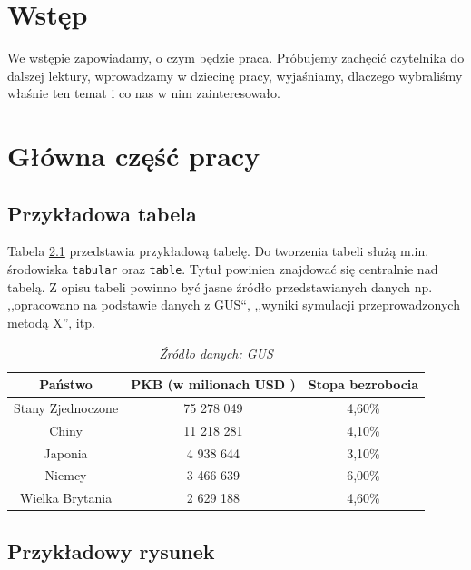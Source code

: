 \documentclass[]{pwr_wmat_praca_dyplomowa}
\theoremstyle{plain}
\numberwithin{theorem}{chapter}
\theoremstyle{definition}
\numberwithin{theorem}{chapter}
\begin{document}
\frontmatter
\maketitle
\mainmatter
\tableofcontents

\chapter{Wstęp}
We wstępie zapowiadamy, o czym będzie praca. Próbujemy zachęcić czytelnika do dalszej lektury, wprowadzamy w dziecinę pracy, wyjaśniamy, dlaczego wybraliśmy właśnie ten temat i co nas w nim zainteresowało.

\chapter{Główna część pracy}

\section{Przykładowa tabela}
Tabela \ref{tab:przykladowa} przedstawia przykładową tabelę. Do tworzenia tabeli służą m.in. środowiska \texttt{tabular} oraz \texttt{table}. Tytuł powinien znajdować się centralnie nad tabelą. Z opisu tabeli powinno być jasne źródło przedstawianych danych np. ,,opracowano na podstawie danych z GUS``, ,,wyniki symulacji przeprowadzonych metodą X'', itp.
\begin{table}[ht]
\caption{Podstawowa Tabela}
\centering
\begin{tabular}{ccc}
	\hline
	\hline                       
	Państwo & PKB (w milionach USD )& Stopa bezrobocia  \\  [0.5ex] 
	\hline 
	Stany Zjednoczone & 75 278 049 & 4,60\%  \\
	Chiny & 11 218 281 & 4,10\%   \\
	Japonia & 4 938 644 & 3,10\%  \\
	Niemcy & 3 466 639 & 6,00\%   \\
	Wielka Brytania & 2 629 188 & 4,60\%  \\ [1ex]  
	\hline 
\end{tabular}
\caption*{\textit{Źródło danych: GUS}} \label{tab:przykladowa} 
\end{table}




\section{Przykładowy rysunek}
\end{document}
